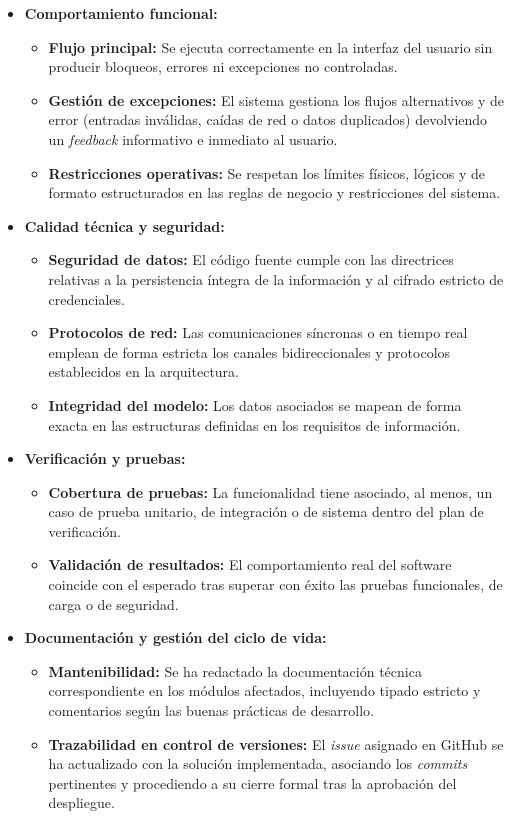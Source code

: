 \begin{itemize}
    \item \textbf{Comportamiento funcional:}
    \begin{itemize}
        \item \textbf{Flujo principal:} Se ejecuta correctamente en la interfaz del usuario sin producir bloqueos, errores ni excepciones no controladas.
        \item \textbf{Gestión de excepciones:} El sistema gestiona los flujos alternativos y de error (entradas inválidas, caídas de red o datos duplicados) devolviendo un \textit{feedback} informativo e inmediato al usuario.
        \item \textbf{Restricciones operativas:} Se respetan los límites físicos, lógicos y de formato estructurados en las reglas de negocio y restricciones del sistema.
    \end{itemize}

    \item \textbf{Calidad técnica y seguridad:}
    \begin{itemize}
        \item \textbf{Seguridad de datos:} El código fuente cumple con las directrices relativas a la persistencia íntegra de la información y al cifrado estricto de credenciales.
        \item \textbf{Protocolos de red:} Las comunicaciones síncronas o en tiempo real emplean de forma estricta los canales bidireccionales y protocolos establecidos en la arquitectura.
        \item \textbf{Integridad del modelo:} Los datos asociados se mapean de forma exacta en las estructuras definidas en los requisitos de información.
    \end{itemize}

    \item \textbf{Verificación y pruebas:}
    \begin{itemize}
        \item \textbf{Cobertura de pruebas:} La funcionalidad tiene asociado, al menos, un caso de prueba unitario, de integración o de sistema dentro del plan de verificación.
        \item \textbf{Validación de resultados:} El comportamiento real del software coincide con el esperado tras superar con éxito las pruebas funcionales, de carga o de seguridad.
    \end{itemize}

    \item \textbf{Documentación y gestión del ciclo de vida:}
    \begin{itemize}
        \item \textbf{Mantenibilidad:} Se ha redactado la documentación técnica correspondiente en los módulos afectados, incluyendo tipado estricto y comentarios según las buenas prácticas de desarrollo.
        \item \textbf{Trazabilidad en control de versiones:} El \textit{issue} asignado en GitHub se ha actualizado con la solución implementada, asociando los \textit{commits} pertinentes y procediendo a su cierre formal tras la aprobación del despliegue.
    \end{itemize}
\end{itemize}

